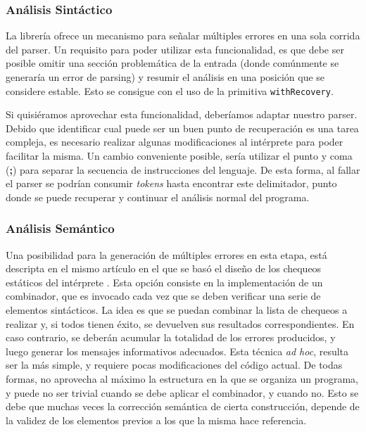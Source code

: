 \subsubsection{Análisis Sintáctico}

La librería \Megaparsec{} ofrece un mecanismo para señalar múltiples errores en una sola corrida del parser.
Un requisito para poder utilizar esta funcionalidad, es que debe ser posible omitir una sección problemática de la entrada (donde comúnmente se generaría un error de parsing) y resumir el análisis en una posición que se considere estable.
Esto se consigue con el uso de la primitiva \lstinline[style = haskell]{withRecovery}.

Si quisiéramos aprovechar esta funcionalidad, deberíamos adaptar nuestro parser.
Debido que identificar cual puede ser un buen punto de recuperación es una tarea compleja, es necesario realizar algunas modificaciones al intérprete para poder facilitar la misma.
Un cambio conveniente posible, sería utilizar el punto y coma (\textbf{;}) para separar la secuencia de instrucciones del lenguaje.
De esta forma, al fallar el parser se podrían consumir \textit{tokens} hasta encontrar este delimitador, punto donde se puede recuperar y continuar el análisis normal del programa.

\subsubsection{Análisis Semántico}

Una posibilidad para la generación de múltiples errores en esta etapa, está descripta en el mismo artículo en el que se basó el diseño de los chequeos estáticos del intérprete \parencite{MonadicTC}.
Esta opción consiste en la implementación de un combinador, que es invocado cada vez que se deben verificar una serie de elementos sintácticos.
La idea es que se puedan combinar la lista de chequeos a realizar y, si todos tienen éxito, se devuelven sus resultados correspondientes.
En caso contrario, se deberán acumular la totalidad de los errores producidos, y luego generar los mensajes informativos adecuados.
Esta técnica \textit{ad hoc}, resulta ser la más simple, y requiere pocas modificaciones del código actual.
De todas formas, no aprovecha al máximo la estructura en la que se organiza un programa, y puede no ser trivial cuando se debe aplicar el combinador, y cuando no.
Esto se debe que muchas veces la corrección semántica de cierta construcción, depende de la validez de los elementos previos a los que la misma hace referencia.

